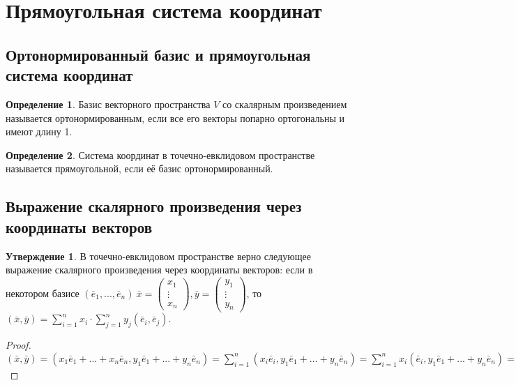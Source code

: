 \documentclass[a4paper, 12pt]{article}
\theoremstyle{definition}
\newtheorem*{definition}{Определение}
\newtheorem*{subtheorem}{Утверждение}
\begin{document}
	\section{Прямоугольная система координат}
	\subsection{Ортонормированный базис и прямоугольная система координат}
	\begin{definition}
		Базис векторного пространства $V$ со скалярным произведением называется ортонормированным, если все его векторы попарно ортогональны и имеют длину 1.
	\end{definition}
	\begin{definition}
		Система координат в точечно-евклидовом пространстве называется прямоугольной, если её базис ортонормированный.
	\end{definition}
	\subsection{Выражение скалярного произведения через координаты векторов}
	\begin{subtheorem}
		В точечно-евклидовом пространстве верно следующее выражение скалярного произведения через координаты векторов: если в некотором базисе $ (\bar{e}_{1},...,\bar{e}_{n}) \ \bar{x} = \begin{pmatrix} x_{1} \\ \vdots \\ x_{n} \end{pmatrix}, \bar{y} = \begin{pmatrix} y_{1} \\ \vdots \\ y_{n} \end{pmatrix}$, то $(\bar{x}, \bar{y}) = \sum \limits_{i=1}^n x_{i} \cdot \sum \limits_{j=1}^n y_{j}(\bar{e}_{i}, \bar{e}_{j})$.
	\end{subtheorem}
	\begin{proof}
		$(\bar{x}, \bar{y}) = (x_{1}\bar{e}_{1}+...+x_{n}\bar{e}_{n}, y_{1}\bar{e}_{1}+...+y_{n}\bar{e}_{n}) = \sum \limits_{i=1}^{n}(x_{i}\bar{e}_{i},y_{1}\bar{e}_{1}+...+y_{n}\bar{e}_{n}) = \sum \limits_{i=1}^{n}x_{i}(\bar{e}_{i},y_{1}\bar{e}_{1}+...+y_{n}\bar{e}_{n}) = \sum \limits_{i=1}^n x_{i} \cdot \sum \limits_{j=1}^n y_{j}(\bar{e}_{i}, \bar{e}_{j})$
	\end{proof}
\end{document}
